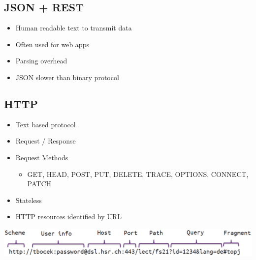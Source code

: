 \subsection{JSON + REST}
\begin{itemize}
    \item Human readable text to transmit data
    \item Often used for web apps
    \item Parsing overhead
    \item JSON slower than binary protocol
\end{itemize}

\subsection{HTTP}
\begin{itemize}
    \item Text based protocol
    \item Request / Response
    \item Request Methods
    \begin{itemize}
        \item GET, HEAD, POST, PUT, DELETE, TRACE, OPTIONS, CONNECT, PATCH
    \end{itemize}
    \item Stateless
    \item HTTP resources identified by URL
\end{itemize}
\includegraphics[width=\linewidth]{../img/http.png}

